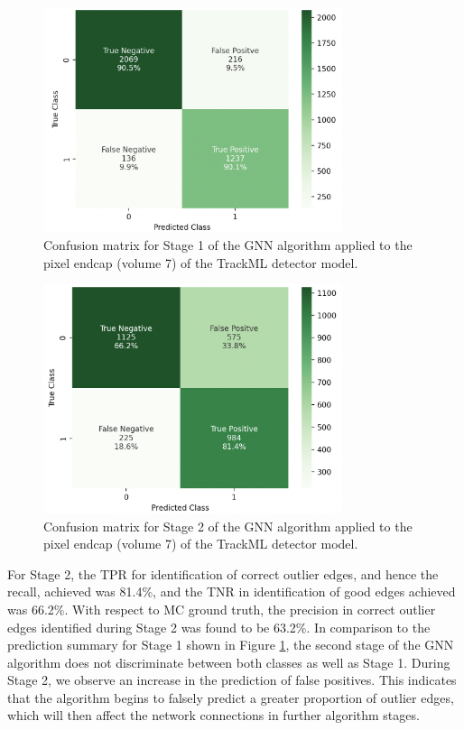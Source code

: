 \begin{figure}[htbp]
    \centering
    \includegraphics[width=0.78\textwidth]{images/7-results/confusion_matrix_endcap_stage_1.png}
    \caption{Confusion matrix for Stage 1 of the GNN algorithm applied to the pixel endcap (volume 7) of the TrackML detector model.}
    \label{fig:confusion-matrix-endcap-stage-1}%
\end{figure}
  

\begin{figure}[htbp]
    \centering
    \includegraphics[width=0.78\textwidth]{images/7-results/confusion_matrix_endcap_stage_2.png}
    \caption{Confusion matrix for Stage 2 of the GNN algorithm applied to the pixel endcap (volume 7) of the TrackML detector model.}
    \label{fig:confusion-matrix-endcap-stage-2}%
\end{figure}


For Stage 2, the TPR for identification of correct outlier edges, and hence the recall, achieved was 81.4\%, and the TNR in identification of good edges achieved was 66.2\%. With respect to MC ground truth, the precision in correct outlier edges identified during Stage 2 was found to be 63.2\%. In comparison to the prediction summary for Stage 1 shown in Figure \ref{fig:confusion-matrix-endcap-stage-1}, the second stage of the GNN algorithm does not discriminate between both classes as well as Stage 1. During Stage 2, we observe an increase in the prediction of false positives. This indicates that the algorithm begins to falsely predict a greater proportion of outlier edges, which will then affect the network connections in further algorithm stages.






